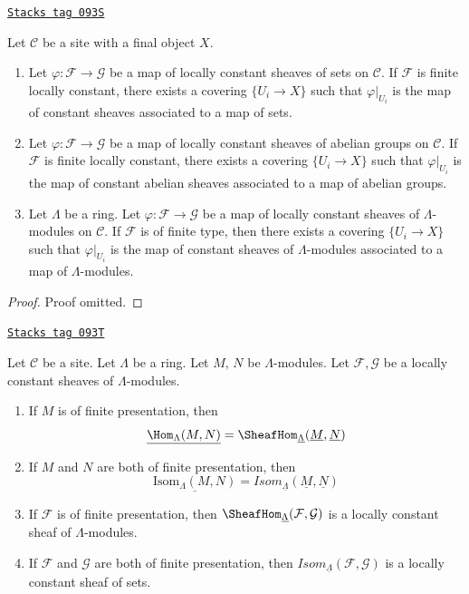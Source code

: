 \begin{lemma}
\label{sites-modules-lemma-morphism-locally-constant}
\href{https://stacks.math.columbia.edu/tag/093S}{\texttt{Stacks tag 093S}}

Let $\mathcal{C}$ be a site with a final object $X$.
\begin{enumerate}
\item Let $\varphi : \mathcal{F} \to \mathcal{G}$ be a map
of locally constant sheaves of sets on $\mathcal{C}$.
If $\mathcal{F}$ is finite locally constant, there exists a
covering $\{U_i \to X\}$ such that
$\varphi|_{U_i}$ is the map of constant sheaves associated to
a map of sets.
\item Let $\varphi : \mathcal{F} \to \mathcal{G}$ be a map
of locally constant sheaves of abelian groups on $\mathcal{C}$.
If $\mathcal{F}$ is finite locally constant, there exists a
covering $\{U_i \to X\}$ such that $\varphi|_{U_i}$ is the map of
constant abelian sheaves associated to a map of abelian groups.
\item Let $\Lambda$ be a ring.
Let $\varphi : \mathcal{F} \to \mathcal{G}$ be a map
of locally constant sheaves of $\Lambda$-modules on $\mathcal{C}$.
If $\mathcal{F}$ is of finite type, then there exists a covering
$\{U_i \to X\}$ such that $\varphi|_{U_i}$ is the map of constant
sheaves of $\Lambda$-modules associated to a map of $\Lambda$-modules.
\end{enumerate}
\end{lemma}

\begin{proof}
Proof omitted.
\end{proof}

\begin{lemma}
\label{sites-modules-lemma-locally-constant}
\href{https://stacks.math.columbia.edu/tag/093T}{\texttt{Stacks tag 093T}}

Let $\mathcal{C}$ be a site. Let $\Lambda$ be a ring.
Let $M$, $N$ be $\Lambda$-modules.
Let $\mathcal{F}, \mathcal{G}$ be a locally constant sheaves of
$\Lambda$-modules.
\begin{enumerate}
\item If $M$ is of finite presentation, then
$$
\underline{\Hom_\Lambda(M, N)} =
\SheafHom_{\underline{\Lambda}}(\underline{M}, \underline{N})
$$
\item If $M$ and $N$ are both of finite presentation, then
$$
\underline{\text{Isom}_\Lambda(M, N)} =
\mathit{Isom}_{\underline{\Lambda}}(\underline{M}, \underline{N})
$$
\item If $\mathcal{F}$ is of finite presentation, then
$\SheafHom_{\underline{\Lambda}}(\mathcal{F}, \mathcal{G})$
is a locally constant sheaf of $\Lambda$-modules.
\item If $\mathcal{F}$ and $\mathcal{G}$ are both of finite presentation, then
$\mathit{Isom}_{\underline{\Lambda}}(\mathcal{F}, \mathcal{G})$
is a locally constant sheaf of sets.
\end{enumerate}
\end{lemma}

